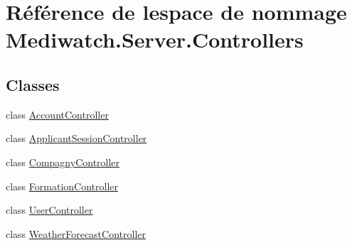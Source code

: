 \hypertarget{namespace_mediwatch_1_1_server_1_1_controllers}{}\section{Référence de l\textquotesingle{}espace de nommage Mediwatch.\+Server.\+Controllers}
\label{namespace_mediwatch_1_1_server_1_1_controllers}
\subsection*{Classes}
\begin{DoxyCompactItemize}
\item 
class \hyperlink{class_mediwatch_1_1_server_1_1_controllers_1_1_account_controller}{Account\+Controller}
\item 
class \hyperlink{class_mediwatch_1_1_server_1_1_controllers_1_1_applicant_session_controller}{Applicant\+Session\+Controller}
\item 
class \hyperlink{class_mediwatch_1_1_server_1_1_controllers_1_1_compagny_controller}{Compagny\+Controller}
\item 
class \hyperlink{class_mediwatch_1_1_server_1_1_controllers_1_1_formation_controller}{Formation\+Controller}
\item 
class \hyperlink{class_mediwatch_1_1_server_1_1_controllers_1_1_user_controller}{User\+Controller}
\item 
class \hyperlink{class_mediwatch_1_1_server_1_1_controllers_1_1_weather_forecast_controller}{Weather\+Forecast\+Controller}
\end{DoxyCompactItemize}
